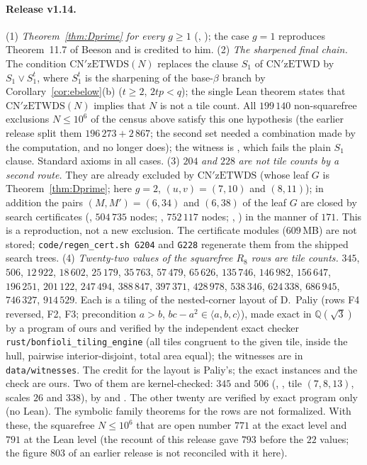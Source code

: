 \documentclass[11pt,reqno]{amsart}
\theoremstyle{plain}
\theoremstyle{definition}
\newcommand{\Q}{\mathbb{Q}}
\begin{document}
\paragraph{Release v1.14.}
(1) \emph{Theorem~\ref{thm:Dprime} for every $g\ge1$} (, ); the case $g=1$ reproduces Theorem~11.7 of Beeson \cite{BeesonIso} and is credited to him.
(2) \emph{The sharpened final chain.} The condition $\mathrm{CN'zETWDS}(N)$ replaces the clause $S_1$ of $\mathrm{CN'zETWD}$ by $S_1\vee S_1^{t}$, where $S_1^{t}$ is the sharpening of the base-$\beta$ branch by Corollary~\ref{cor:ebelow}(b) ($t\ge2$, $2tp<q$); the single Lean theorem  states that $\mathrm{CN'zETWDS}(N)$ implies that $N$ is not a tile count. All $199\,140$ non-squarefree exclusions $N\le10^6$ of the census above satisfy this one hypothesis (the earlier release split them $196\,273+2\,867$; the second set needed a combination made by the computation, and no longer does); the witness is , which fails the plain $S_1$ clause. Standard axioms in all cases.
(3) $204$ \emph{and} $228$ \emph{are not tile counts by a second route.} They are already excluded by $\mathrm{CN'zETWDS}$ (whose leaf $G$ is Theorem~\ref{thm:Dprime}; here $g=2$, $(u,v)=(7,10)$ and $(8,11)$); in addition the pairs $(M,M')=(6,34)$ and $(6,38)$ of the leaf $G$ are closed by search certificates (, $504\,735$ nodes; , $752\,117$ nodes; , ) in the manner of $171$. This is a reproduction, not a new exclusion. The certificate modules ($609$\,MB) are not stored; \texttt{code/regen\_cert.sh G204} and \texttt{G228} regenerate them from the shipped search trees.
(4) \emph{Twenty-two values of the squarefree $R_8$ rows are tile counts.} $345$, $506$, $12\,922$, $18\,602$, $25\,179$, $35\,763$, $57\,479$, $65\,626$, $135\,746$, $146\,982$, $156\,647$, $196\,251$, $201\,122$, $247\,494$, $388\,847$, $397\,371$, $428\,978$, $538\,346$, $624\,338$, $686\,945$, $746\,327$, $914\,529$. Each is a tiling of the nested-corner layout of D.~Paliy \cite{PaliyLedger} (rows F4 reversed, F2, F3; precondition $a>b$, $bc-a^2\in\langle a,b,c\rangle$), made exact in $\Q(\sqrt3)$ by a program of ours and verified by the independent exact checker \texttt{rust/bonfioli\_tiling\_engine} (all tiles congruent to the given tile, inside the hull, pairwise interior-disjoint, total area equal); the witnesses are in \texttt{data/witnesses}. The credit for the layout is Paliy's; the exact instances and the check are ours. Two of them are kernel-checked: $345$ and $506$ (, , tile $(7,8,13)$, scales $26$ and $338$), by  and . The other twenty are verified by exact program only (no Lean). The symbolic family theorems for the rows are not formalized. With these, the squarefree $N\le10^6$ that are open number $771$ at the exact level and $791$ at the Lean level (the recount of this release gave $793$ before the $22$ values; the figure $803$ of an earlier release is not reconciled with it here).
\end{document}
